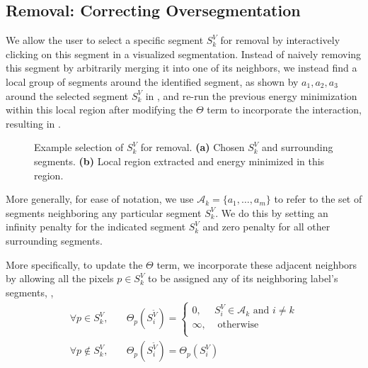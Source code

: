 \documentclass[]{spie}  %
\begin{document}
\subsection{Removal: Correcting Oversegmentation}
\label{sec:remove}

We allow the user to select a specific segment $S^V_k$ for removal by
interactively clicking on this segment in a visualized segmentation.
Instead of naively removing this segment by arbitrarily merging it
into one of its neighbors, we instead find a local group of segments
around the identified segment, as shown by $a_1, a_2, a_3$ around the
selected segment $S^V_k$ in , and re-run the
previous energy minimization within this local region after modifying
the $\Theta$ term to incorporate the interaction, resulting in
.
\begin{figure}[htbp]
\centering
{}
\hspace{0.1em}
\caption{Example selection of $S^V_k$ for removal.  \textbf{(a)}
  Chosen $S^V_k$ and surrounding segments.  \textbf{(b)} Local region
  extracted and energy minimized in this
  region.} \label{fig:removal-ex}
\end{figure}
More generally, for ease of notation, we use $ \mathcal{A}_k = \{a_1,
\ldots, a_m\} $ to refer to the set of segments neighboring any
particular segment $S^V_k$.  We do this by setting an infinity penalty
for the indicated segment $S^V_k$ and zero penalty for all other
surrounding segments.

More specifically, to update the $\Theta$ term, we incorporate these
adjacent neighbors by allowing all the pixels $p\in S^V_k$ to be
assigned any of its neighboring label's segments, \ie,
\begin{equation}\label{eq:remove}
\begin{aligned}
 \forall p \in S^V_k ,& \quad \Theta_p(S^{\tilde{V}}_i) = \left\{
   \begin{array}{lcr}
     0, & S^V_i \in \mathcal{A}_k \textrm{ and } i \neq k  \\
     \infty, & \textrm{ otherwise} \\
   \end{array}
 \right. \\
\forall p \notin S^V_k ,& \quad \Theta_p(S^{\tilde{V}}_i) = \Theta_p(S^V_i)
\end{aligned}
\end{equation}
\end{document}
